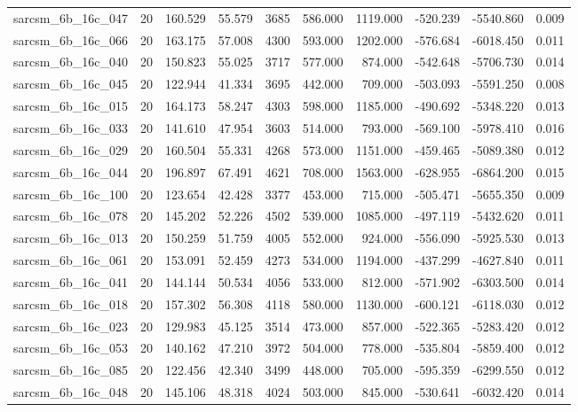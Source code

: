 \begin{tabular}{lrrrrrrrrr}
sarcsm\_6b\_16c\_047 & 20 & 160.529 & 55.579 & 3685 & 586.000 & 1119.000 & -520.239 & -5540.860 & 0.009 \\
sarcsm\_6b\_16c\_066 & 20 & 163.175 & 57.008 & 4300 & 593.000 & 1202.000 & -576.684 & -6018.450 & 0.011 \\
sarcsm\_6b\_16c\_040 & 20 & 150.823 & 55.025 & 3717 & 577.000 & 874.000 & -542.648 & -5706.730 & 0.014 \\
sarcsm\_6b\_16c\_045 & 20 & 122.944 & 41.334 & 3695 & 442.000 & 709.000 & -503.093 & -5591.250 & 0.008 \\
sarcsm\_6b\_16c\_015 & 20 & 164.173 & 58.247 & 4303 & 598.000 & 1185.000 & -490.692 & -5348.220 & 0.013 \\
sarcsm\_6b\_16c\_033 & 20 & 141.610 & 47.954 & 3603 & 514.000 & 793.000 & -569.100 & -5978.410 & 0.016 \\
sarcsm\_6b\_16c\_029 & 20 & 160.504 & 55.331 & 4268 & 573.000 & 1151.000 & -459.465 & -5089.380 & 0.012 \\
sarcsm\_6b\_16c\_044 & 20 & 196.897 & 67.491 & 4621 & 708.000 & 1563.000 & -628.955 & -6864.200 & 0.015 \\
sarcsm\_6b\_16c\_100 & 20 & 123.654 & 42.428 & 3377 & 453.000 & 715.000 & -505.471 & -5655.350 & 0.009 \\
sarcsm\_6b\_16c\_078 & 20 & 145.202 & 52.226 & 4502 & 539.000 & 1085.000 & -497.119 & -5432.620 & 0.011 \\
sarcsm\_6b\_16c\_013 & 20 & 150.259 & 51.759 & 4005 & 552.000 & 924.000 & -556.090 & -5925.530 & 0.013 \\
sarcsm\_6b\_16c\_061 & 20 & 153.091 & 52.459 & 4273 & 534.000 & 1194.000 & -437.299 & -4627.840 & 0.011 \\
sarcsm\_6b\_16c\_041 & 20 & 144.144 & 50.534 & 4056 & 533.000 & 812.000 & -571.902 & -6303.500 & 0.014 \\
sarcsm\_6b\_16c\_018 & 20 & 157.302 & 56.308 & 4118 & 580.000 & 1130.000 & -600.121 & -6118.030 & 0.012 \\
sarcsm\_6b\_16c\_023 & 20 & 129.983 & 45.125 & 3514 & 473.000 & 857.000 & -522.365 & -5283.420 & 0.012 \\
sarcsm\_6b\_16c\_053 & 20 & 140.162 & 47.210 & 3972 & 504.000 & 778.000 & -535.804 & -5859.400 & 0.012 \\
sarcsm\_6b\_16c\_085 & 20 & 122.456 & 42.340 & 3499 & 448.000 & 705.000 & -595.359 & -6299.550 & 0.012 \\
sarcsm\_6b\_16c\_048 & 20 & 145.106 & 48.318 & 4024 & 503.000 & 845.000 & -530.641 & -6032.420 & 0.014 \\

\end{tabular}
